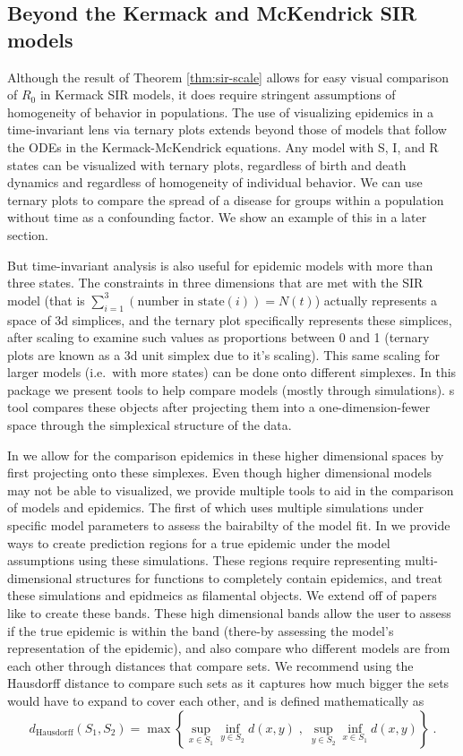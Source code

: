 \documentclass[
  shortnames]{jss}
\begin{document}
\hypertarget{beyond-the-kermack-and-mckendrick-sir-models}{%
\subsection{Beyond the Kermack and McKendrick SIR
models}\label{beyond-the-kermack-and-mckendrick-sir-models}}

Although the result of Theorem \ref{thm:sir-scale} allows for easy
visual comparison of \(R_0\) in Kermack SIR models, it does require
stringent assumptions of homogeneity of behavior in populations. The use
of visualizing epidemics in a time-invariant lens via ternary plots
extends beyond those of models that follow the ODEs in the
Kermack-McKendrick equations. Any model with S, I, and R states can be
visualized with ternary plots, regardless of birth and death dynamics
and regardless of homogeneity of individual behavior. We can use ternary
plots to compare the spread of a disease for groups within a population
without time as a confounding factor. We show an example of this in a
later section.

But time-invariant analysis is also useful for epidemic models with more
than three states. The constraints in three dimensions that are met with
the SIR model (that is
\(\sum_{i=1}^3 (\text{number in state}(i)) = N(t)\)) actually represents
a space of 3d simplices, and the ternary plot specifically represents
these simplices, after scaling to examine such values as proportions
between 0 and 1 (ternary plots are known as a 3d unit simplex due to
it's scaling). This same scaling for larger models (i.e.~with more
states) can be done onto different simplexes. In this package we present
tools to help compare models (mostly through simulations). s tool
compares these objects after projecting them into a one-dimension-fewer
space through the simplexical structure of the data.

In  we allow for the comparison epidemics in these
higher dimensional spaces by first projecting onto these simplexes. Even
though higher dimensional models may not be able to visualized, we
provide multiple tools to aid in the comparison of models and epidemics.
The first of which uses multiple simulations under specific model
parameters to assess the bairabilty of the model fit. In
 we provide ways to create prediction regions for a true
epidemic under the model assumptions using these simulations. These
regions require representing multi-dimensional structures for functions
to completely contain epidemics, and treat these simulations and
epidmeics as filamental objects. We extend off of papers like
\citet{Dalmasso2019a} to create these bands. These high dimensional
bands allow the user to assess if the true epidemic is within the band
(there-by assessing the model's representation of the epidemic), and
also compare who different models are from each other through distances
that compare sets. We recommend using the Hausdorff distance to compare
such sets as it captures how much bigger the sets would have to expand
to cover each other, and is defined mathematically as \[
d_\text{Hausdorff}(S_1, S_2) = \max \left\{ \sup_{x \in S_1} \inf_{y \in S_2} d(x,y) \;,\; \sup_{y \in S_2} \inf_{x \in S_1} d(x,y)\right\}\;.
\]
\end{document}
